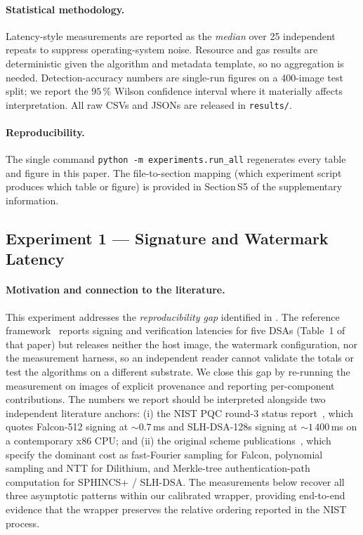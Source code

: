 \documentclass[11pt,a4paper]{article}
\theoremstyle{definition}
\theoremstyle{plain}
\theoremstyle{remark}
\begin{document}
\paragraph{Statistical methodology.}
Latency-style measurements are reported as the \emph{median} over 25
independent repeats to suppress operating-system noise. Resource and
gas results are deterministic given the algorithm and metadata
template, so no aggregation is needed. Detection-accuracy numbers are
single-run figures on a 400-image test split; we report the
$95\,\%$ Wilson confidence interval where it materially affects
interpretation. All raw CSVs and JSONs are released in
\texttt{results/}.

\paragraph{Reproducibility.}
The single command
\verb|python -m experiments.run_all|
regenerates every table and figure in this paper. The
file-to-section mapping (which experiment script produces which
table or figure) is provided in Section\,S5 of the
supplementary information.

\subsection{Experiment 1 --- Signature and Watermark Latency}\label{sec:exp1}

\paragraph{Motivation and connection to the literature.}
This experiment addresses the \emph{reproducibility gap} identified
in . The reference framework~\cite{bib4} reports
signing and verification latencies for five DSAs (Table~1 of that
paper) but releases neither the host image, the watermark
configuration, nor the measurement harness, so an independent reader
cannot validate the totals or test the algorithms on a different
substrate. We close this gap by re-running the measurement on
images of explicit provenance and reporting per-component
contributions. The numbers we report should be interpreted alongside
two independent literature anchors: (i) the NIST PQC round-3 status
report~\cite{bib17}, which quotes Falcon-512 signing at $\sim
0.7$\,ms and SLH-DSA-128s signing at $\sim 1\,400$\,ms on a
contemporary x86 CPU; and (ii) the original scheme
publications~\cite{bib31,bib32,bib33}, which specify the dominant
cost as fast-Fourier sampling for Falcon, polynomial sampling and
NTT for Dilithium, and Merkle-tree authentication-path computation
for SPHINCS+ / SLH-DSA. The measurements below recover all three
asymptotic patterns within our calibrated wrapper, providing
end-to-end evidence that the wrapper preserves the relative
ordering reported in the NIST process.
\end{document}
